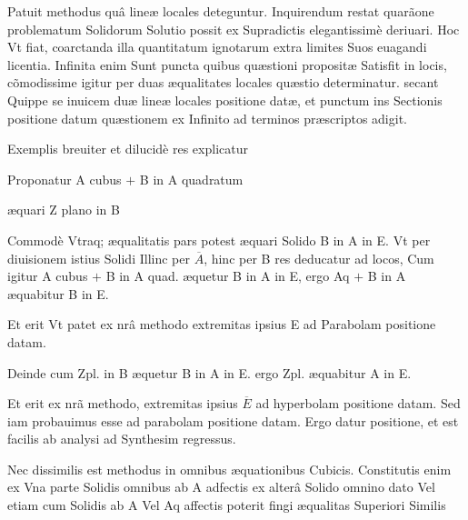 \documentclass[11pt,a4paper]{article}
\begin{document}
Patuit methodus quâ lineæ locales deteguntur. Inquirendum restat quarãone problematum Solidorum Solutio possit ex Supradictis elegantissimè deriuari. Hoc Vt fiat, coarctanda illa quantitatum ignotarum extra limites Suos euagandi licentia. Infinita enim Sunt puncta quibus quæstioni propositæ Satisfit in locis, cõmodissime igitur per duas æqualitates locales quæstio determinatur. \struck{\ill{}} secant Quippe se inuicem duæ lineæ locales positione datæ, et punctum ins \struck{\ill{}}Sectionis positione datum quæstionem ex Infinito ad terminos præscriptos adigit.

Exemplis breuiter et dilucidè res explicatur

Proponatur A cubus $+$ B in A quadratum 

æquari Z plano in B

Commodè Vtraq; æqualitatis pars potest æquari Solido B in A in E. Vt per diuisionem istius Solidi Illinc per $\overline{A}$, hinc per B res deducatur ad locos, Cum igitur A cubus $+$ B in A quad. æquetur B in A in E, ergo Aq $+$ B in A æquabitur B in E.

Et erit Vt patet ex nrâ methodo extremitas ipsius E ad Parabolam positione datam.

Deinde cum Zpl. in B æquetur B in A in E. ergo Zpl. æquabitur A in E.

Et erit ex nrã methodo, extremitas ipsius $\overline{E}$ ad hyperbolam positione datam. Sed iam probauimus esse ad parabolam positione datam. Ergo datur positione, et est facilis ab analysi ad Synthesim regressus.

Nec dissimilis est methodus in omnibus æquationibus Cubicis. Constitutis enim ex Vna parte Solidis omnibus ab A adfectis ex alterâ Solido omnino dato Vel etiam cum Solidis ab A Vel Aq affectis poterit fingi æqualitas Superiori Similis
\end{document}
